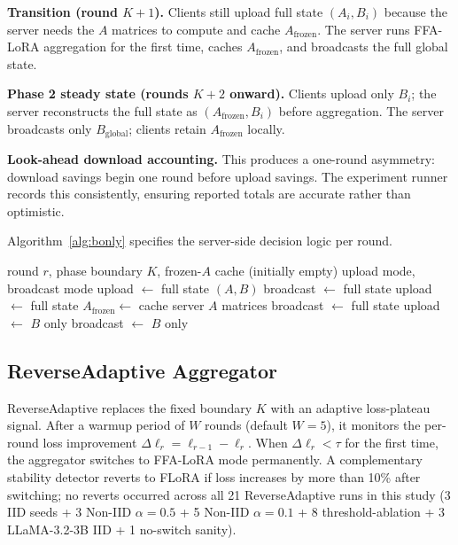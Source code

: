 \textbf{Transition (round $K{+}1$).}
Clients still upload full state $(A_i, B_i)$ because the server needs the $A$ matrices to compute and cache $A_{\text{frozen}}$. The server runs FFA-LoRA \citep{sun2024ffalora} aggregation for the first time, caches $A_{\text{frozen}}$, and broadcasts the full global state.

\textbf{Phase 2 steady state (rounds $K{+}2$ onward).}
Clients upload only $B_i$; the server reconstructs the full state as $(A_{\text{frozen}}, B_i)$ before aggregation. The server broadcasts only $B_{\text{global}}$; clients retain $A_{\text{frozen}}$ locally.

\textbf{Look-ahead download accounting.}
This produces a one-round asymmetry: download savings begin one round before upload savings. The experiment runner records this consistently, ensuring reported totals are accurate rather than optimistic.

Algorithm~\ref{alg:bonly} specifies the server-side decision logic per round.

\begin{algorithm}[t]
\caption{Bidirectional B-only protocol (server, per round)}
\label{alg:bonly}
\begin{algorithmic}[1]
\Require round $r$, phase boundary $K$, frozen-$A$ cache (initially empty)
\Ensure upload mode, broadcast mode
 
    \State upload $\leftarrow$ full state $(A, B)$
    \State broadcast $\leftarrow$ full state
 
    \State upload $\leftarrow$ full state
    \State $A_{\text{frozen}} \leftarrow$ cache server $A$ matrices
    \State broadcast $\leftarrow$ full state
\Else {}
    \State upload $\leftarrow$ $B$ only 
    \State broadcast $\leftarrow$ $B$ only 
\EndIf
\end{algorithmic}
\end{algorithm}

\subsection{ReverseAdaptive Aggregator}
ReverseAdaptive replaces the fixed boundary $K$ with an adaptive loss-plateau signal. After a warmup period of $W$ rounds (default $W{=}5$), it monitors the per-round loss improvement $\Delta\ell_r = \ell_{r-1} - \ell_r$. When $\Delta\ell_r < \tau$ for the first time, the aggregator switches to FFA-LoRA \citep{sun2024ffalora} mode permanently. A complementary stability detector reverts to FLoRA if loss increases by more than 10\% after switching; no reverts occurred across all 21 ReverseAdaptive runs in this study (3 IID seeds + 3 Non-IID $\alpha{=}0.5$ + 5 Non-IID $\alpha{=}0.1$ + 8 threshold-ablation + 3 LLaMA-3.2-3B IID + 1 no-switch sanity).

